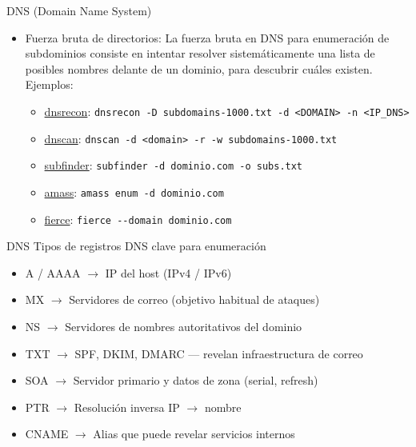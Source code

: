\documentclass[aspectratio=169,11pt]{beamer}
\newcommand{\cmd}[1]{\texttt{#1}}
\begin{document}
\begin{frame}[allowframebreaks]{DNS (Domain Name System)}
\begin{itemize}
\begin{itemize}
  \item \href{https://nmap.org/}{nmap}
    \begin{itemize}
    \item \cmd{nmap -{}-script dns-nsid IP}
    \item \cmd{nmap dns-srv-enum IP}
    \item \cmd{nmap -sSU -p53 -{}-script dns-nsec-enum\\ -{}-script-args dns-nsec-enum.domains=paypal.com IP}
    \end{itemize}
    \end{itemize}
    
  \item Fuerza bruta de directorios: La fuerza bruta en DNS para enumeración de subdominios consiste en intentar resolver sistemáticamente una lista de posibles nombres delante de un dominio, para descubrir cuáles existen. Ejemplos:
    \begin{itemize}
      \item \href{https://github.com/darkoperator/dnsrecon}{dnsrecon}:
            \cmd{dnsrecon -D subdomains-1000.txt -d <DOMAIN> -n <IP\_DNS>}\\
      \item \href{https://github.com/rbsec/dnscan}{dnscan}:
            \cmd{dnscan -d <domain> -r -w subdomains-1000.txt}
      \item \href{https://github.com/projectdiscovery/subfinder}{subfinder}:
            \cmd{subfinder -d dominio.com -o subs.txt} 
      \item \href{https://github.com/owasp-amass/amass}{amass}:
            \cmd{amass enum -d dominio.com} 
      \item \href{https://github.com/mschwager/fierce}{fierce}:
            \cmd{fierce -{}-domain dominio.com} 

  \end{itemize}

\end{itemize}
\end{frame}

\begin{frame}[allowframebreaks]{DNS}
\small
Tipos de registros DNS clave para enumeración
  \begin{itemize}
  \item A / AAAA $\rightarrow$ IP del host (IPv4 / IPv6)
  \item MX $\rightarrow$ Servidores de correo (objetivo habitual de ataques)
  \item NS $\rightarrow$ Servidores de nombres autoritativos del dominio
  \item TXT $\rightarrow$ SPF, DKIM, DMARC --- revelan infraestructura de correo
  \item SOA $\rightarrow$ Servidor primario y datos de zona (serial, refresh)
  \item PTR $\rightarrow$ Resolución inversa IP $\rightarrow$ nombre
  \item CNAME $\rightarrow$ Alias que puede revelar servicios internos
  
  
  \end{itemize}
\end{frame}
\end{document}
